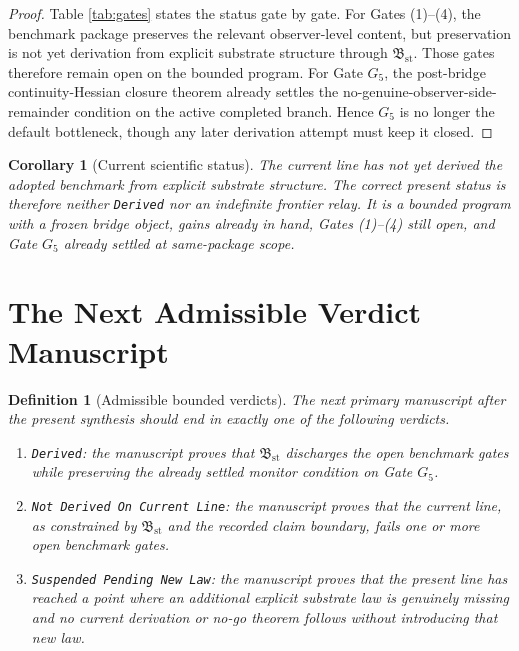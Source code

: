 \documentclass[11pt]{article}
\newcommand{\StableBridgeObject}{\mathfrak B_{\mathrm{st}}}
\newcommand{\GateFive}{G_{5}}
\newtheorem{definition}{Definition}
\newtheorem{corollary}{Corollary}
\begin{document}
\begin{proof}
Table \ref{tab:gates} states the status gate by gate. For Gates (1)--(4), the benchmark package preserves the relevant observer-level content, but preservation is not yet derivation from explicit substrate structure through \(\StableBridgeObject\). Those gates therefore remain open on the bounded program. For Gate \(\GateFive\), the post-bridge continuity-Hessian closure theorem already settles the no-genuine-observer-side-remainder condition on the active completed branch. Hence \(\GateFive\) is no longer the default bottleneck, though any later derivation attempt must keep it closed.
\end{proof}

\begin{corollary}[Current scientific status]
The current line has not yet derived the adopted benchmark from explicit substrate structure. The correct present status is therefore neither \texttt{Derived} nor an indefinite frontier relay. It is a bounded program with a frozen bridge object, gains already in hand, Gates (1)--(4) still open, and Gate \(\GateFive\) already settled at same-package scope.
\end{corollary}

\section{The Next Admissible Verdict Manuscript}

\begin{definition}[Admissible bounded verdicts]
The next primary manuscript after the present synthesis should end in exactly one of the following verdicts.
\begin{enumerate}
    \item \texttt{Derived}: the manuscript proves that \(\StableBridgeObject\) discharges the open benchmark gates while preserving the already settled monitor condition on Gate \(\GateFive\).
    \item \texttt{Not Derived On Current Line}: the manuscript proves that the current line, as constrained by \(\StableBridgeObject\) and the recorded claim boundary, fails one or more open benchmark gates.
    \item \texttt{Suspended Pending New Law}: the manuscript proves that the present line has reached a point where an additional explicit substrate law is genuinely missing and no current derivation or no-go theorem follows without introducing that new law.
\end{enumerate}
\end{definition}
\end{document}
